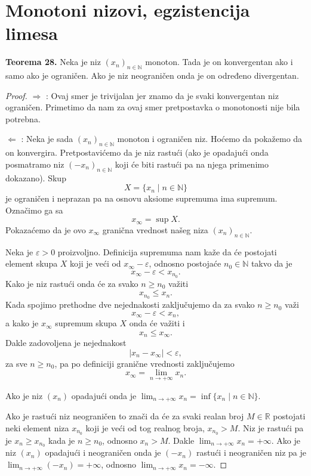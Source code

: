 \documentclass[a4paper,12pt]{article}
\theoremstyle{plain}
\theoremstyle{definition}
\theoremstyle{remark}
\begin{document}
\section{Monotoni nizovi, egzistencija limesa}
\textbf{Teorema 28.} Neka je niz $(x_n)_{n \in \mathbb{N}}$ monoton. Tada je on konvergentan ako i samo ako je ograničen. Ako je niz neograničen onda je on određeno divergentan.
\begin{proof}
$\Longrightarrow$ : Ovaj smer je trivijalan jer znamo da je svaki konvergentan niz ograničen. Primetimo da nam za ovaj smer pretpostavka o monotonosti nije bila potrebna.

$\Longleftarrow$ : Neka je sada $(x_n)_{n \in \mathbb{N}}$ monoton i ograničen niz. Hoćemo da pokažemo da on konvergira. Pretpostavićemo da je niz rastući (ako je opadajući onda posmatramo niz $(-x_n)_{n \in \mathbb{N}}$ koji će biti rastući pa na njega primenimo dokazano). Skup
$$ X = \{x_n \mid n \in \mathbb{N}\} $$
je ograničen i neprazan pa na osnovu aksiome supremuma ima supremum. Označimo ga sa
$$ x_{\infty} = \sup X. $$
Pokazaćemo da je ovo $x_{\infty}$ granična vrednost našeg niza $(x_n)_{n \in \mathbb{N}}$.

Neka je $\varepsilon > 0$ proizvoljno. Definicija supremuma nam kaže da će postojati element skupa $X$ koji je veći od $x_{\infty} - \varepsilon$, odnosno postojaće $n_0 \in \mathbb{N}$ takvo da je
$$ x_{\infty} - \varepsilon < x_{n_0}. $$
Kako je niz rastući onda će za svako $n \geq n_0$ važiti
$$ x_{n_0} \leq x_n. $$
Kada spojimo prethodne dve nejednakosti zaključujemo da za svako $n \geq n_0$ važi
$$ x_{\infty} - \varepsilon < x_n, $$
a kako je $x_{\infty}$ supremum skupa $X$ onda će važiti i
$$ x_n \leq x_{\infty}. $$
Dakle zadovoljena je nejednakost
$$ |x_n - x_{\infty}| < \varepsilon, $$
za sve $n \geq n_0$, pa po definiciji granične vrednosti zaključujemo
$$ x_{\infty} = \lim_{n \to +\infty} x_n. $$

Ako je niz $(x_n)$ opadajući onda je $\lim_{n \to +\infty} x_n = \inf\{x_n \mid n \in \mathbb{N}\}$.

Ako je rastući niz neograničen to znači da će za svaki realan broj $M \in \mathbb{R}$ postojati neki element niza $x_{n_0}$ koji je veći od tog realnog broja, $x_{n_0} > M$. Niz je rastući pa je $x_n \geq x_{n_0}$ kada je $n \geq n_0$, odnosno $x_n > M$. Dakle $\lim_{n \to +\infty} x_n = +\infty$. Ako je niz $(x_n)$ opadajući i neograničen onda je $(-x_n)$ rastući i neograničen niz pa je $\lim_{n \to +\infty} (-x_n) = +\infty$, odnosno $\lim_{n \to +\infty} x_n = -\infty$.
\end{proof}
\end{document}
